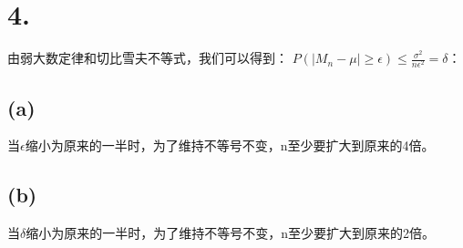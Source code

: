\documentclass[UTF8]{report}
\begin{document}
    \section*{4.}
        由弱大数定律和切比雪夫不等式，我们可以得到：
        $P(|M_n - \mu| \geq \epsilon) \leq \frac{\sigma^2}{n\epsilon^2} = \delta$：
        \subsection*{(a)}
            当$\epsilon$缩小为原来的一半时，为了维持不等号不变，n至少要扩大到原来的4倍。
        \subsection*{(b)}
            当$\delta$缩小为原来的一半时，为了维持不等号不变，n至少要扩大到原来的2倍。
\end{document}
